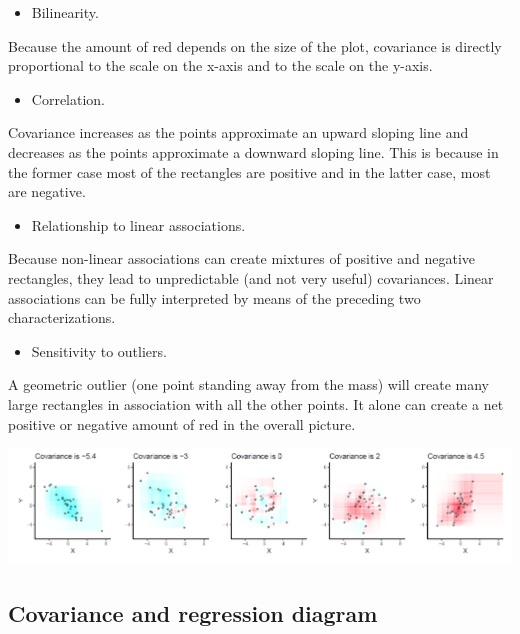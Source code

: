 \documentclass[
]{report}
\providecommand{\tightlist}{%
  \setlength{\itemsep}{0pt}\setlength{\parskip}{0pt}}
\begin{document}
\begin{itemize}
\tightlist
\item
  Bilinearity.
\end{itemize}

Because the amount of red depends on the size of the plot, covariance is directly proportional to the scale on the x-axis and to the scale on the y-axis.

\begin{itemize}
\tightlist
\item
  Correlation.
\end{itemize}

Covariance increases as the points approximate an upward sloping line and decreases as the points approximate a downward sloping line. This is because in the former case most of the rectangles are positive and in the latter case, most are negative.

\begin{itemize}
\tightlist
\item
  Relationship to linear associations.
\end{itemize}

Because non-linear associations can create mixtures of positive and negative rectangles, they lead to unpredictable (and not very useful) covariances. Linear associations can be fully interpreted by means of the preceding two characterizations.

\begin{itemize}
\tightlist
\item
  Sensitivity to outliers.
\end{itemize}

A geometric outlier (one point standing away from the mass) will create many large rectangles in association with all the other points. It alone can create a net positive or negative amount of red in the overall picture.

\includegraphics{covRect.PNG}

\hypertarget{covariance-and-regression-diagram}{%
\subsection{Covariance and regression diagram}\label{covariance-and-regression-diagram}}
\end{document}
